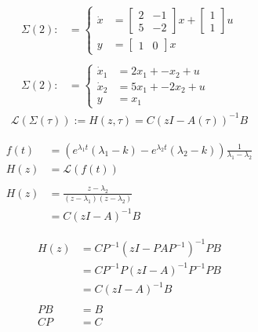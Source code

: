 \documentclass[11 pt]{article}
\newcommand{\1}{\mathbbm{1}}
\begin{document}
       \begin{align*}
         \Sigma(2) :&= \left\{ \begin{array}{ll}
         \dot{x} &= \left[ \begin{array}{cc} 2 & -1 \\ 5 & -2 \end{array} \right] x + \left[ \begin{array}{c} 1 \\ 1 \end{array}\right] u \\
           y &= \left[ \begin{array}{cc} 1 & 0 \end{array} \right] x
         \end{array} \right. \\ \\
         \Sigma(2) :&= \left\{ \begin{array}{ll}
        \dot{x}_{1} &= 2 x_{1} + - x_{2} + u \\
        \dot{x}_{2} &= 5 x_{1} + -2 x_{2} + u \\
      y &= x_{1}
      \end{array} \right.
    \end{align*}
    \begin{align*}
      \mathcal{L}(\Sigma(\tau)) := H(z, \tau) = C \left(zI - A(\tau) \right)^{-1} B
    \end{align*}
    
    \begin{align*}
      f(t) &= \left( e^{\lambda_{1} t} \left(\lambda_{1} - k\right) - e^{\lambda_{2}t}\left(\lambda_{2} - k \right) \right) \frac{1}{\lambda_{1}-\lambda_{2}} \\
        H(z) &= \mathcal{L}\left(f(t)\right) \\ \\
        H(z) &= \frac{z - \lambda_{2}}{\left(z -\lambda_{1} \right)\left(z - \lambda_{2} \right)} \\
        &= C( zI - A)^{-1}B
    \end{align*}

    \begin{align*}
        H(z) &= CP^{-1}( zI - PAP^{-1})^{-1}PB \\
        &= CP^{-1}P( zI - A)^{-1}P^{-1}PB \\
        &= C( zI - A)^{-1}B \\ \\
      PB &= B \\
      CP &= C
    \end{align*}
\end{document}

